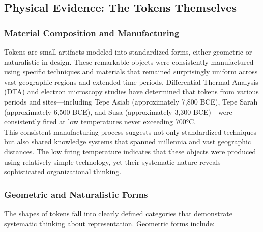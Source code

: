 \documentclass[12pt, oneside, openany]{book}
\begin{document}
\subsection{Physical Evidence: The Tokens Themselves}

\subsubsection{Material Composition and Manufacturing}

Tokens are small artifacts modeled into standardized forms, either geometric or naturalistic in design. These remarkable objects were consistently manufactured using specific techniques and materials that remained surprisingly uniform across vast geographic regions and extended time periods. Differential Thermal Analysis (DTA) and electron microscopy studies have determined that tokens from various periods and sites—including Tepe Asiab (approximately 7,800 BCE), Tepe Sarah (approximately 6,500 BCE), and Susa (approximately 3,300 BCE)—were consistently fired at low temperatures never exceeding 700°C.\\
This consistent manufacturing process suggests not only standardized techniques but also shared knowledge systems that spanned millennia and vast geographic distances. The low firing temperature indicates that these objects were produced using relatively simple technology, yet their systematic nature reveals sophisticated organizational thinking.

\subsubsection{Geometric and Naturalistic Forms}

The shapes of tokens fall into clearly defined categories that demonstrate systematic thinking about representation. Geometric forms include:
\end{document}
